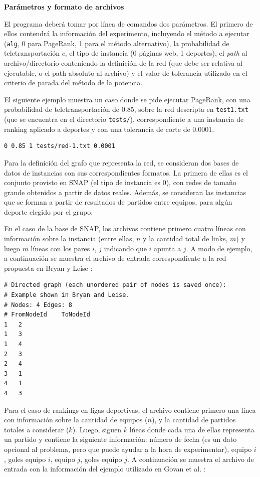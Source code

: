 \vskip 5pt
\noindent\textbf{Par\'ametros y formato de archivos}
\vskip 5pt

El programa deber\'a tomar por l\'inea de comandos dos par\'ametros. El primero de ellos contendr\'a la informaci\'on del experimento, incluyendo
el m\'etodo a ejecutar (\verb+alg+, 0 para PageRank, 1 para el m\'etodo alternativo), la probabilidad de teletransportaci\'on $c$, el tipo de instancia
(0 p\'aginas web, 1 deportes), el \emph{path} al archivo/directorio conteniendo la definici\'on de la red (que debe ser relativa al ejecutable, o el path 
absoluto al archivo) y el valor de tolerancia utilizado en el criterio de parada del m\'etodo de la potencia. 

El siguiente ejemplo muestra un caso donde se pide ejecutar PageRank, con una probabilidad de teletransportaci\'on de 0.85, sobre la red descripta en 
\verb+test1.txt+ (que se encuentra en el directorio \verb+tests/+), correspondiente a una instancia de ranking aplicado a deportes y con una tolerancia 
de corte de $0.0001$.
\begin{verbatim}
0 0.85 1 tests/red-1.txt 0.0001
\end{verbatim}

Para la definici\'on del grafo que representa la red, se consideran dos bases de datos de instancias con sus correspondientes formatos. La primera
de ellas es el conjunto provisto en SNAP \cite{SNAP} (el tipo de instancia es 0), con redes de tama\~no grande obtenidos a partir de datos reales. Adem\'as, 
se consideran las instancias que se forman a partir de resultados de partidos entre equipos, para alg\'un deporte elegido por el grupo. 

En el caso de la base de SNAP, los archivos contiene primero cuatro l\'ineas con informaci\'on sobre la instancia (entre ellas, $n$ y la cantidad
total de links, $m$) y luego $m$ l\'ineas con los pares $i$, $j$ indicando que $i$ apunta a $j$. A modo de ejemplo, a continuaci\'on se muestra el 
archivo de entrada correspondiente a la red propuesta en Bryan y Leise \cite[Figura 1]{Bryan2006}: 

\begin{verbatim}
# Directed graph (each unordered pair of nodes is saved once): 
# Example shown in Bryan and Leise.
# Nodes: 4 Edges: 8 
# FromNodeId    ToNodeId
1   2
1   3
1   4
2   3
2   4
3   1
4   1
4   3
\end{verbatim}

Para el caso de rankings en ligas deportivas, el archivo contiene primero una l\'inea con informaci\'on sobre la cantidad de equipos ($n$), y la cantidad
de partidos totales a considerar ($k$). Luego, siguen $k$ l\'neas donde cada una de ellas representa un partido y contiene la siguiente informaci\'on: 
n\'umero de fecha (es un dato opcional al problema, pero que puede ayudar a la hora de experimentar), equipo $i$, goles equipo $i$, equipo $j$, goles equipo $j$.
A continuaci\'on se muestra el archivo de entrada con la informaci\'on del ejemplo utilizado en Govan et al. \cite{Govan2008}:

